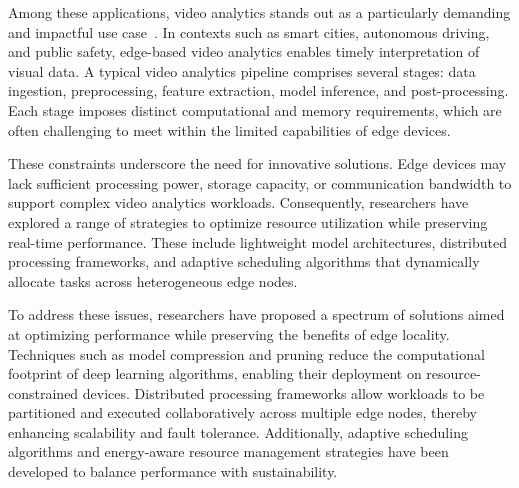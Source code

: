 Among these applications, video analytics stands out as a particularly demanding and impactful use case~\cite{}. In contexts such as smart cities, autonomous driving, and public safety, edge-based video analytics enables timely interpretation of visual data. A typical video analytics pipeline comprises several stages: data ingestion, preprocessing, feature extraction, model inference, and post-processing. Each stage imposes distinct computational and memory requirements, which are often challenging to meet within the limited capabilities of edge devices.

These constraints underscore the need for innovative solutions. Edge devices may lack sufficient processing power, storage capacity, or communication bandwidth to support complex video analytics workloads. Consequently, researchers have explored a range of strategies to optimize resource utilization while preserving real-time performance. These include lightweight model architectures, distributed processing frameworks, and adaptive scheduling algorithms that dynamically allocate tasks across heterogeneous edge nodes.

To address these issues, researchers have proposed a spectrum of solutions aimed at optimizing performance while preserving the benefits of edge locality. Techniques such as model compression and pruning reduce the computational footprint of deep learning algorithms, enabling their deployment on resource-constrained devices. Distributed processing frameworks allow workloads to be partitioned and executed collaboratively across multiple edge nodes, thereby enhancing scalability and fault tolerance. Additionally, adaptive scheduling algorithms and energy-aware resource management strategies have been developed to balance performance with sustainability.




